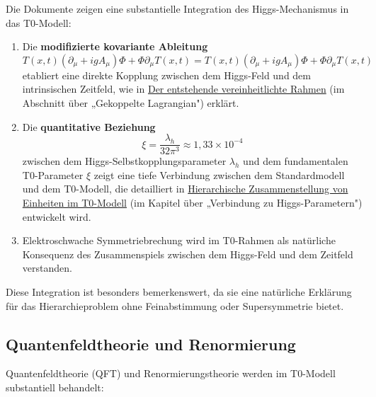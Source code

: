 \documentclass[12pt,a4paper]{article}
\newcommand{\Tfieldt}{T(x,t)}
\newcommand{\DhiggsTt}{\Tfieldt (\partial_\mu + ig A_\mu) \Phi + \Phi \partial_\mu \Tfieldt}
\begin{document}
	Die Dokumente zeigen eine substantielle Integration des Higgs-Mechanismus in das T0-Modell:
	
	\begin{enumerate}
		\item Die \textbf{modifizierte kovariante Ableitung}
		\begin{equation}
			\DhiggsTt = \Tfieldt (\partial_\mu + ig A_\mu) \Phi + \Phi \partial_\mu \Tfieldt
		\end{equation}
		etabliert eine direkte Kopplung zwischen dem Higgs-Feld und dem intrinsischen Zeitfeld, wie in \href{https://github.com/jpascher/T0-Time-Mass-Duality/tree/main/2/pdf/English/ausblicke_En.pdf}{Der entstehende vereinheitlichte Rahmen} (im Abschnitt über „Gekoppelte Lagrangian") erklärt.
		
		\item Die \textbf{quantitative Beziehung}
		\begin{equation}
			\xi = \frac{\lambda_h}{32\pi^3} \approx 1,33 \times 10^{-4}
		\end{equation}
		zwischen dem Higgs-Selbstkopplungsparameter $\lambda_h$ und dem fundamentalen T0-Parameter $\xi$ zeigt eine tiefe Verbindung zwischen dem Standardmodell und dem T0-Modell, die detailliert in \href{https://github.com/jpascher/T0-Time-Mass-Duality/tree/main/2/pdf/English/NatEinheitenSystematikEn.pdf}{Hierarchische Zusammenstellung von Einheiten im T0-Modell} (im Kapitel über „Verbindung zu Higgs-Parametern") entwickelt wird.
		
		\item Elektroschwache Symmetriebrechung wird im T0-Rahmen als natürliche Konsequenz des Zusammenspiels zwischen dem Higgs-Feld und dem Zeitfeld verstanden.
	\end{enumerate}
	
	Diese Integration ist besonders bemerkenswert, da sie eine natürliche Erklärung für das Hierarchieproblem ohne Feinabstimmung oder Supersymmetrie bietet.
	
	\subsection{Quantenfeldtheorie und Renormierung}
	\label{subsec:qft_renormalization}
	
	Quantenfeldtheorie (QFT) und Renormierungstheorie werden im T0-Modell substantiell behandelt:
	
\end{document}
